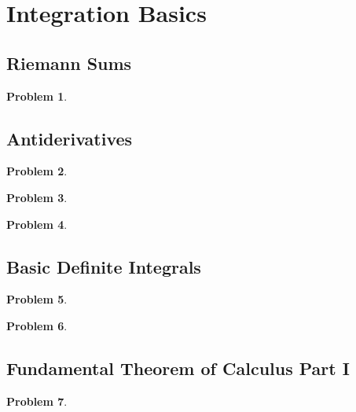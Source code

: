 \documentclass{article}
\newtheorem{problem}{Problem}
\begin{document}
\section{Integration Basics}
\subsection{Riemann Sums}\label{secMPSRiemannSums}
\begin{problem}

\end{problem}


\subsection{Antiderivatives}\label{secMPSantiderivatives}
\begin{problem}

\end{problem}
\begin{problem}

\end{problem}
\begin{problem}

\end{problem}

\subsection{Basic Definite Integrals} \label{secMPSBasicDefiniteIntegrals}
\begin{problem}

\end{problem}

\begin{problem}

\end{problem}
\subsection{Fundamental Theorem of Calculus Part I}\label{secMPSFTCpart1}
\begin{problem}

\end{problem}

\end{document}
